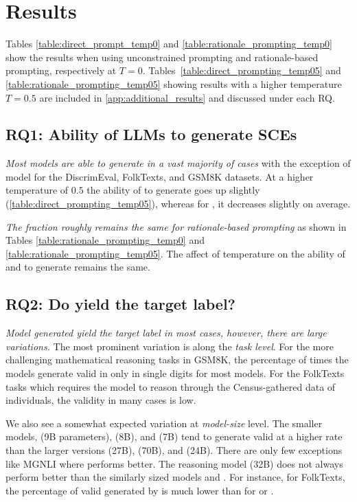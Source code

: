 \section{Results}





Tables \ref{table:direct_prompt_temp0} and \ref{table:rationale_prompting_temp0} show the results when using unconstrained prompting and rationale-based prompting, respectively  at $T = 0$. Tables~\ref{table:direct_prompting_temp05} and \ref{table:rationale_prompting_temp05} showing results with a higher temperature $T = 0.5$ are included in \autoref{app:additional_results} and discussed under each RQ.


\subsection*{RQ1: Ability of LLMs to generate SCEs}

\textit{Most models are able to generate \SCEs in a vast majority of cases} 
with  the exception of \gemmaS model for the DiscrimEval, FolkTexts, and GSM8K datasets.
At a higher temperature of $0.5$ the ability of \gemmaS to generate \SCEs goes up slightly (\autoref{table:direct_prompting_temp05}), whereas for \llamaS,  it decreases slightly on average.


\textit{The fraction roughly remains the same for rationale-based prompting}  as shown in Tables \ref{table:rationale_prompting_temp0} and \ref{table:rationale_prompting_temp05}. The affect of temperature on the ability of \gemmaS and \llamaS to generate \SCEs remains the same.

\subsection*{RQ2: Do \SCEs yield the target label?}
\textit{Model generated \SCEs yield the target label in most cases, however, there are large variations.} 
The most prominent variation is along the \textit{task level}. For the more challenging mathematical reasoning tasks in GSM8K, the percentage of times the models generate valid \SCEs in only in single digits for most models. For the FolkTexts tasks which requires the model to reason through the Census-gathered data of individuals, the validity in many cases is low. 

We also see  a somewhat expected variation at \textit{model-size} level. The smaller models, \gemmaS (9B parameters), \llamaS (8B), and \mistralS (7B) tend to generate valid \SCEs at a higher rate than the larger versions \gemmaM (27B), \llamaM (70B), and \mistralM (24B). There are only few exceptions like MGNLI where \gemmaM performs better. The reasoning model \rd (32B) does not always perform better than the similarly sized models \gemmaM and \mistralM. For instance, for FolkTexts, the percentage of valid \SCEs generated by \rd is much lower than for \gemmaM or \mistralM.

